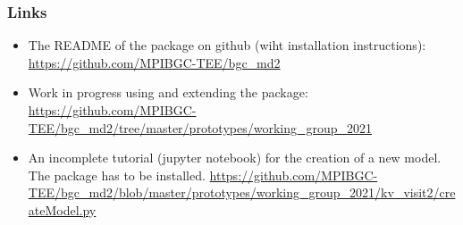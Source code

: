 \begin{frame}
	\frametitle{Links}
  \begin{itemize}
    \item
      The README of the package on github (wiht installation instructions):
      \url{https://github.com/MPIBGC-TEE/bgc_md2}
    \item
      Work in progress using and extending the package:
      \url{https://github.com/MPIBGC-TEE/bgc_md2/tree/master/prototypes/working_group_2021}
    \item
      An incomplete tutorial (jupyter notebook) for the creation of a new model.
      The package has to be installed.
      \url{https://github.com/MPIBGC-TEE/bgc_md2/blob/master/prototypes/working_group_2021/kv_visit2/createModel.py}
  \end{itemize}
\end{frame}



